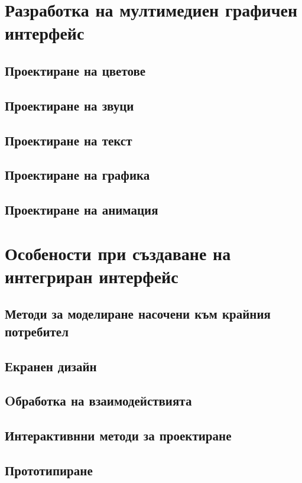 \documentclass[fleqn,12pt]{article}
\begin{document}
\section{Разработка на мултимедиен графичен интерфейс}

\subsection{Проектиране на цветове}
\subsection{Проектиране на звуци}
\subsection{Проектиране на текст}
\subsection{Проектиране на графика}
\subsection{Проектиране на анимация}

\section{Особености при създаване на интегриран интерфейс}

\subsection{Методи за моделиране насочени  към  крайния  потребител}
\subsection{Екранен  дизайн}
\subsection{Oбработка  на взаимодействията}
\subsection{Интерактивнни методи за проектиране}
\subsection{Прототипиране}
\end{document}
